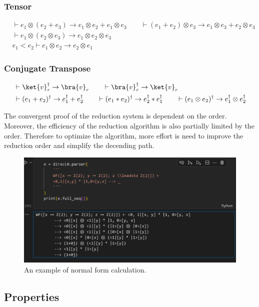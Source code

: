 \subsubsection*{Tensor}
\begin{align*}
  & \vdash e_1 \otimes (e_2 + e_3) \to e_1 \otimes e_2 + e_1 \otimes e_3
  \qquad \vdash (e_1 + e_2) \otimes e_3 \to e_1 \otimes e_3 + e_2 \otimes e_3\\
  & \vdash e_1 \otimes (e_2 \otimes e_3) \to e_1 \otimes e_2 \otimes e_3\\
  & e_1 < e_2 \vdash e_1 \otimes e_2 \to e_2 \otimes e_1
\end{align*}

\subsubsection*{Conjugate Transpose}
\begin{align*}
  & \vdash \ket{v}_r^\dagger \to \bra{v}_r \qquad \vdash \bra{v}_r^\dagger \to \ket{v}_r\\
  & \vdash (e_1 + e_2)^\dagger \to e_1^\dagger + e_2^\dagger \qquad \vdash (e_1 * e_2)^\dagger \to e_2^\dagger * e_1^\dagger \qquad \vdash (e_1 \otimes e_2)^\dagger \to e_1^\dagger \otimes e_2^\dagger
\end{align*}
  
  
The convergent proof of the reduction system is dependent on the order. Moreover, the efficiency of the reduction algorithm is also partially limited by the order. Therefore to optimize the algorithm, more effort is need to improve the reduction order and simplify the decending path.

\begin{figure}[h]
  \center
  \includegraphics*[width = 0.7 \textwidth]{fig/red_illustration.png}
  \caption{An example of normal form calculation.}
\end{figure}

\subsection{Properties}

